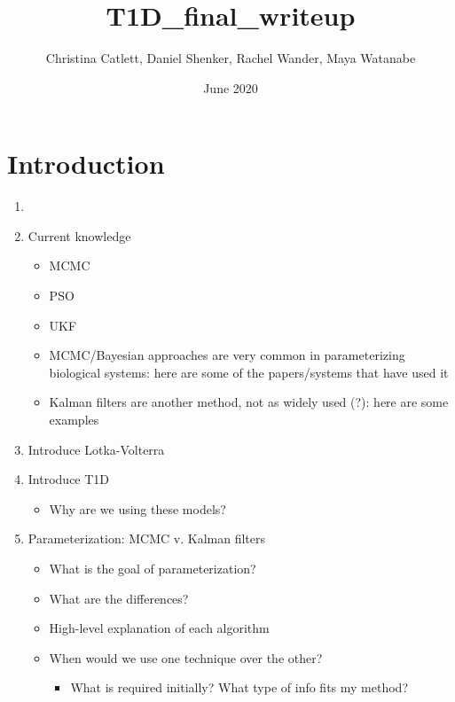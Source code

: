 \documentclass{article}
\title{T1D_{final\_writeup}}
\author{Christina Catlett, Daniel Shenker, Rachel Wander, Maya Watanabe}
\date{June 2020}
\begin{document}
\maketitle

\section{Introduction}
\begin{enumerate}
    \item 
    \item Current knowledge
    \begin{itemize}
        \item MCMC
        \item PSO
        \item UKF
        \item MCMC/Bayesian approaches are very common in parameterizing biological systems: here are some of the papers/systems that have used it
        \item Kalman filters are another method, not as widely used (?): here are some examples
    \end{itemize}
    \item Introduce Lotka-Volterra
    \item Introduce T1D
    \begin{itemize}
        \item Why are we using these models?
    \end{itemize}
    \item Parameterization: MCMC v. Kalman filters
    \begin{itemize}
        \item What is the goal of parameterization?
        \item What are the differences?
        \item High-level explanation of each algorithm
        \item When would we use one technique over the other?
        \begin{itemize}
            \item What is required initially? What type of info fits my method?
        \end{itemize}
    \end{itemize}
\end{enumerate}
\end{document}
